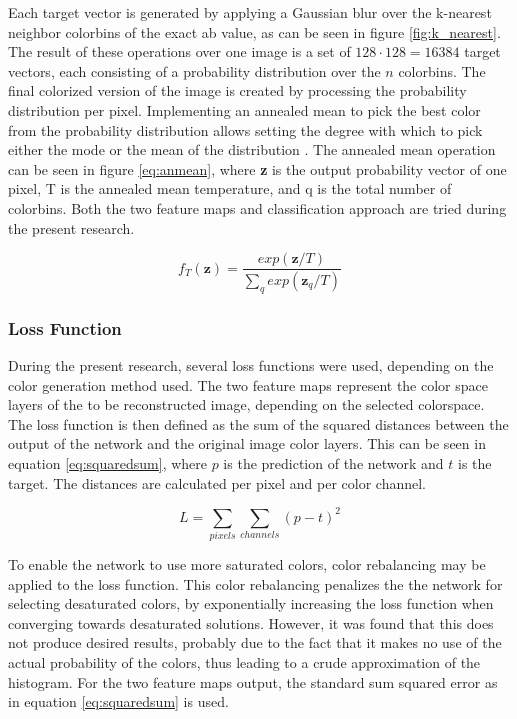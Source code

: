Each target vector is generated by applying a Gaussian blur over the k-nearest neighbor colorbins of the exact ab value, as can be seen in figure \ref{fig:k_nearest}. The result of these operations over one image is a set of $128 \cdot 128=16384$ target vectors, each consisting of a probability distribution over the $n$ colorbins. 
The final colorized version of the image is created by processing the probability distribution per pixel. Implementing an annealed mean to pick the best color from the probability distribution allows setting the degree with which to pick either the mode or the mean of the distribution \cite{Zhang}. The annealed mean operation can be seen in figure \ref{eq:anmean}, where \textbf{z} is the output probability vector of one pixel, T is the annealed mean temperature, and q is the total number of colorbins. Both the two feature maps and classification approach are tried during the present research.

\begin{equation}
f_{T}(\textbf{z})=\frac{exp(\textbf{z}/T)}{\sum_q^{}exp(\textbf{z}_{q}/T)}
\label{eq:anmean}
\end{equation}



\subsubsection{Loss Function}
During the present research, several loss functions were used, depending on the color generation method used.
The two feature maps represent the color space layers of the to be reconstructed image, depending on the selected colorspace. The loss function is then defined as the sum of the squared distances between the output of the network and the original image color layers. This can be seen in equation \ref{eq:squaredsum}, where $p$ is the prediction of the network and $t$ is the target. The distances are calculated per pixel and per color channel.

\begin{equation}
\label{eq:squaredsum}
L = \sum_{pixels} \sum_{channels}(p - t)^2
\end{equation}

To enable the network to use more saturated colors, color rebalancing may be applied to the loss function. This color rebalancing penalizes the the network for selecting desaturated colors, by exponentially increasing the loss function when converging towards desaturated solutions. However, it was found that this does not produce desired results, probably due to the fact that it makes no use of the actual probability of the colors, thus leading to a crude approximation of the histogram. For the two feature maps output, the standard sum squared error as in equation \ref{eq:squaredsum} is used.

